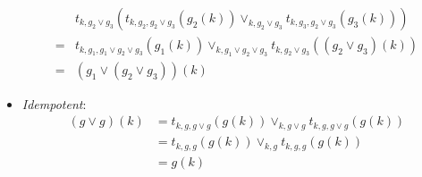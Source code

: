 \documentclass{article}
\begin{document}
\begin{itemize}
\begin{align*}
               & t_{k, g_2 \vee g_3}(t_{k, g_2, g_2 \vee g_3}(g_2(k)) \vee_{k, g_2 \vee g_3} t_{k, g_3, g_2 \vee g_3}(g_3(k))) \\
              =& t_{k, g_1, g_1 \vee g_2 \vee g_3}(g_1(k)) \vee_{k, g_1 \vee g_2 \vee g_3} t_{k, g_2 \vee g_3}((g_2 \vee g_3)(k)) \\
              =& (g_1 \vee (g_2 \vee g_3))(k)
            \end{align*}
          \item \emph{Idempotent}:
            \begin{align*}
              (g \vee g)(k) &= t_{k, g, g \vee g}(g(k)) \vee_{k, g \vee g} t_{k, g, g \vee g}(g(k)) \\
              &= t_{k, g, g}(g(k)) \vee_{k, g} t_{k, g, g}(g(k)) \\
              &= g(k)
            \end{align*}
        \end{itemize}
\end{document}
